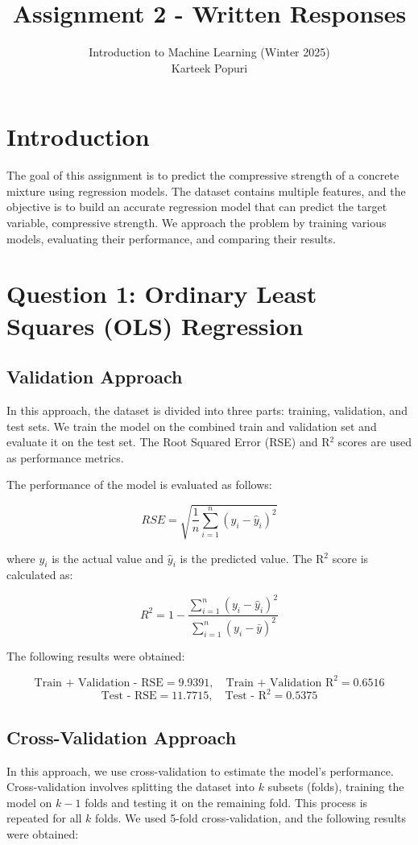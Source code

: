 \documentclass[a4paper,12pt]{article}
\title{Assignment 2 - Written Responses}
\author{Introduction to Machine Learning (Winter 2025)\\ Karteek Popuri}
\date{}
\begin{document}
\maketitle



\section*{Introduction}
The goal of this assignment is to predict the compressive strength of a concrete mixture using regression models. The dataset contains multiple features, and the objective is to build an accurate regression model that can predict the target variable, compressive strength. We approach the problem by training various models, evaluating their performance, and comparing their results.

\section*{Question 1: Ordinary Least Squares (OLS) Regression}

\subsection*{Validation Approach}
In this approach, the dataset is divided into three parts: training, validation, and test sets. We train the model on the combined train and validation set and evaluate it on the test set. The Root Squared Error (RSE) and R\(^2\) scores are used as performance metrics.

The performance of the model is evaluated as follows:

\[
RSE = \sqrt{\frac{1}{n}\sum_{i=1}^{n} (y_i - \hat{y}_i)^2}
\]

where \(y_i\) is the actual value and \(\hat{y}_i\) is the predicted value. The R\(^2\) score is calculated as:

\[
R^2 = 1 - \frac{\sum_{i=1}^{n} (y_i - \hat{y}_i)^2}{\sum_{i=1}^{n} (y_i - \bar{y})^2}
\]

The following results were obtained:

\[
\text{Train + Validation - RSE} = 9.9391, \quad \text{Train + Validation R}^2 = 0.6516
\]
\[
\text{Test - RSE} = 11.7715, \quad \text{Test - R}^2 = 0.5375
\]

\subsection*{Cross-Validation Approach}
In this approach, we use cross-validation to estimate the model's performance. Cross-validation involves splitting the dataset into \(k\) subsets (folds), training the model on \(k-1\) folds and testing it on the remaining fold. This process is repeated for all \(k\) folds. We used 5-fold cross-validation, and the following results were obtained:
\end{document}
